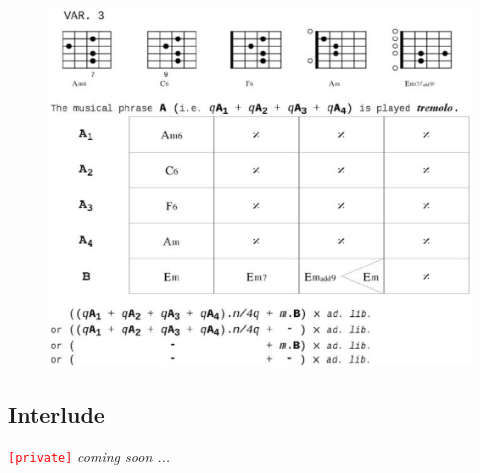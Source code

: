  \begin{figure}[H]
\begin{center}
\includegraphics[scale=0.66]{img/tn2}
\end{center}
\end{figure}

\subsection*{\quad Interlude}
\label{interlude}

\bigskip
\texttt{\textcolor{red}{\small[private]}} \textit{coming soon ...}

